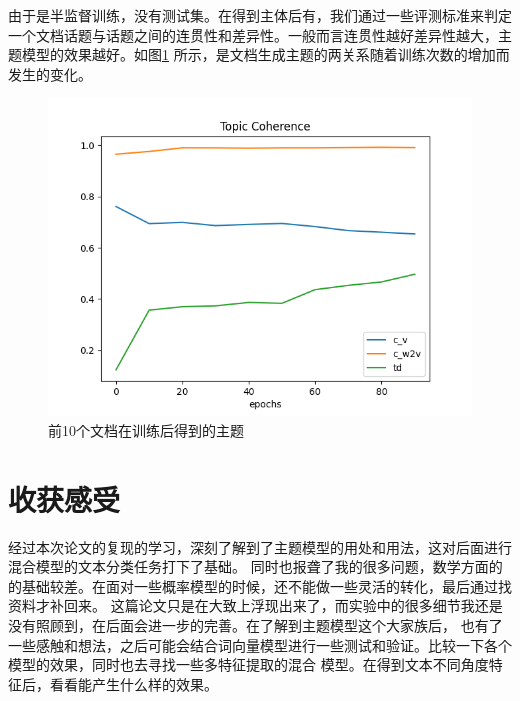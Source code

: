\documentclass[twocolumn]{article}
\begin{document}
	由于是半监督训练，没有测试集。在得到主体后有，我们通过一些评测标准来判定一个文档话题与话题之间的连贯性和差异性。一般而言连贯性越好差异性越大，主题模型的效果越好。如图\ref{fig:006} 所示，是文档生成主题的两关系随着训练次数的增加而发生的变化。
\begin{figure}
	\centering
	\includegraphics[width=0.9\linewidth]{figures/005.png}
	\caption{{\small 前10个文档在训练后得到的主题}}
	\label{fig:006}
\end{figure}	

\section{收获感受}
	经过本次论文的复现的学习，深刻了解到了主题模型的用处和用法，这对后面进行混合模型的文本分类任务打下了基础。
	同时也报聋了我的很多问题，数学方面的的基础较差。在面对一些概率模型的时候，还不能做一些灵活的转化，最后通过找资料才补回来。
	这篇论文只是在大致上浮现出来了，而实验中的很多细节我还是没有照顾到，在后面会进一步的完善。在了解到主题模型这个大家族后，
	也有了一些感触和想法，之后可能会结合词向量模型进行一些测试和验证。比较一下各个模型的效果，同时也去寻找一些多特征提取的混合
	模型。在得到文本不同角度特征后，看看能产生什么样的效果。

\newpage
\end{document}

